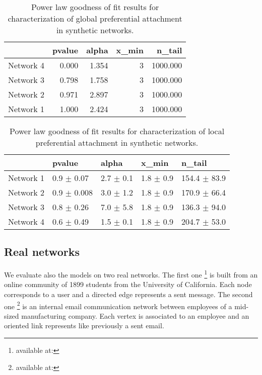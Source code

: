 \documentclass[a4paper, 12pt]{article}
\begin{document}



\begin{table}[h]
\label{table:synt_graph}
\caption{Power law goodness of fit results for characterization of global preferential attachment in synthetic networks.}
\centering
    \begin{tabular}{lrrrr}
    \hline
               &   pvalue &   alpha &   x\_min &   n\_tail \\
    \hline
     Network 4 &    0.000 &   1.354 &       3 & 1000.000 \\
     Network 3 &    0.798 &   1.758 &       3 & 1000.000 \\
     Network 2 &    0.971 &   2.897 &       3 & 1000.000 \\
     Network 1 &    1.000 &   2.424 &       3 & 1000.000 \\
    \hline
    \end{tabular}
\end{table}

\begin{table}[h]
\label{table:synt_graph_local}
\caption{Power law goodness of fit results for characterization of local preferential attachment in synthetic networks.}
\centering
    \begin{tabular}{lllll}
    \hline
    & pvalue          & alpha           & x\_min        & n\_tail           \\
    \hline
    Network 1 & 0.9 $\pm$ 0.07  & 2.7 $\pm$ 0.1 & 1.8 $\pm$ 0.9 & 154.4 $\pm$ 83.9 \\
    Network 2 & 0.9 $\pm$ 0.008 & 3.0 $\pm$ 1.2  & 1.8 $\pm$ 0.9 & 170.9 $\pm$ 66.4  \\
    Network 3 & 0.8 $\pm$ 0.26 & 7.0 $\pm$ 5.8 & 1.8 $\pm$ 0.9 & 136.3 $\pm$ 94.0 \\
    Network 4 & 0.6 $\pm$ 0.49    & 1.5 $\pm$ 0.1 & 1.8 $\pm$ 0.9 & 204.7 $\pm$ 53.0 \\
    \hline
    \end{tabular}
\end{table}


\subsection{Real networks}

We evaluate also the models on two  real networks.
The first one \footnote{available at:} is built from an online community of 1899 students from the University of California. Each node corresponds to a user and a    directed edge represents a sent message.
The second one \footnote{available at:} is an internal email communication network between employees of a mid-sized manufacturing company. Each vertex is associated  to an employee and an oriented link represents like previously a sent email.
\end{document}
